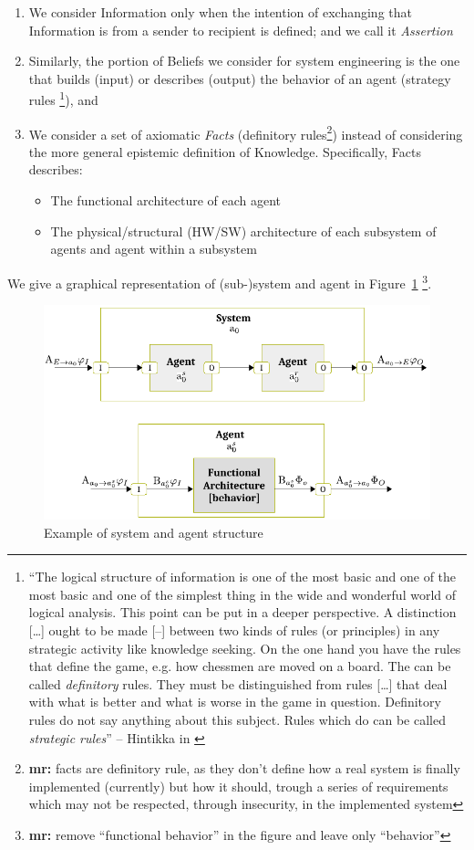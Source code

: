 \documentclass[conference]{IEEEtran}
\newcommand{\fixnote}[2]{\textbf{\color{red}{FIX}}\footnote{{\bf #1:} #2}}
\begin{document}
\begin{enumerate}
	\item We consider Information only when the intention of exchanging 
		that Information is from a sender to 
		recipient is defined; and we call it \emph{Assertion}  
	\item Similarly, the portion of Beliefs we consider for system
		engineering is the one that builds (input) or describes
		(output) the behavior of an agent (strategy rules
		\footnote{``The logical structure of information is one of the
		most basic and one of the most basic and one of the simplest
		thing in the wide and wonderful world of logical analysis. This
		point can be put in a deeper perspective. A distinction
		[\ldots] ought to be made [--] between two kinds of rules (or
		principles) in any strategic activity like knowledge seeking.
		On the one hand you have the rules that define the game, e.g.
		how chessmen are moved on a board. The can be called
		\emph{definitory} rules.  They must be distinguished from rules
		[\ldots] that deal with what is better and what is worse in the
		game in question.  Definitory rules do not say anything about
		this subject. Rules which do can be called \emph{strategic
		rules}'' -- Hintikka in \autocite{Hintikka1993Information}}),
		and
	\item We consider a set of axiomatic \emph{Facts} (definitory
		rules\fixnote{mr}{facts are definitory rule, as they don't
		define how a real system is finally implemented (currently) but
		how it should, trough a series of requirements which may not be
		respected, through insecurity, in the implemented system})
		instead of considering the more general epistemic definition of
		Knowledge. Specifically, Facts describes:
		\begin{itemize}
			\item The functional architecture of each agent
			\item The physical/structural (HW/SW) architecture of each
				subsystem of agents and agent within a
				subsystem
		\end{itemize}
\end{enumerate}
We give a graphical representation of (sub-)system and agent in Figure~\ref{fig:system-agent}
\fixnote{mr}{remove ``functional behavior'' in the figure and leave only ``behavior''}.

\begin{figure}[t]
	\centering
	\includegraphics[width=.9\columnwidth]{system-agent.pdf}
	\caption{Example of system and agent structure}
	\label{fig:system-agent}
\end{figure}
\end{document}
